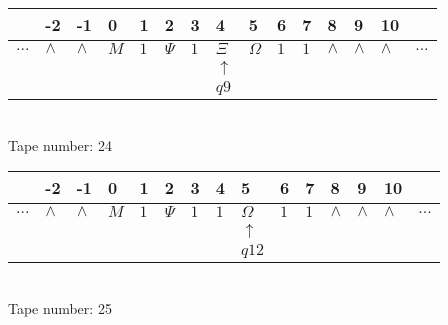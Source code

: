 \documentclass{article}
\begin{document}
\begin{table}[H]
\centering
\begin{tabular}{lllllllllllllll}
 & -2 & -1 & 0 & 1 & 2 & 3 & 4 & 5 & 6 & 7 & 8 & 9 & 10 & \\
\hline
$...$ & \multicolumn{1}{|l|}{$\wedge$} & \multicolumn{1}{|l|}{$\wedge$} & \multicolumn{1}{|l|}{$M$} & \multicolumn{1}{|l|}{$1$} & \multicolumn{1}{|l|}{$\Psi$} & \multicolumn{1}{|l|}{$1$} & \multicolumn{1}{|l|}{$\Xi$} & \multicolumn{1}{|l|}{$\Omega$} & \multicolumn{1}{|l|}{$1$} & \multicolumn{1}{|l|}{$1$} & \multicolumn{1}{|l|}{$\wedge$} & \multicolumn{1}{|l|}{$\wedge$} & \multicolumn{1}{|l|}{$\wedge$} & $...$\\
\hline
&  &  &  &  &  &  & $\uparrow$ &  &  &  &  &  &  &  \\
&  &  &  &  &  &  & $ q9 $ &  &  &  &  &  &  &  \\
\end{tabular}
\\
Tape number: 24
\noindent\makebox[\linewidth]{\hdashrule{\textwidth}{1pt}{1pt}}\end{table}

\begin{table}[H]
\centering
\begin{tabular}{lllllllllllllll}
 & -2 & -1 & 0 & 1 & 2 & 3 & 4 & 5 & 6 & 7 & 8 & 9 & 10 & \\
\hline
$...$ & \multicolumn{1}{|l|}{$\wedge$} & \multicolumn{1}{|l|}{$\wedge$} & \multicolumn{1}{|l|}{$M$} & \multicolumn{1}{|l|}{$1$} & \multicolumn{1}{|l|}{$\Psi$} & \multicolumn{1}{|l|}{$1$} & \multicolumn{1}{|l|}{$1$} & \multicolumn{1}{|l|}{$\Omega$} & \multicolumn{1}{|l|}{$1$} & \multicolumn{1}{|l|}{$1$} & \multicolumn{1}{|l|}{$\wedge$} & \multicolumn{1}{|l|}{$\wedge$} & \multicolumn{1}{|l|}{$\wedge$} & $...$\\
\hline
&  &  &  &  &  &  &  & $\uparrow$ &  &  &  &  &  &  \\
&  &  &  &  &  &  &  & $ q12 $ &  &  &  &  &  &  \\
\end{tabular}
\\
Tape number: 25
\noindent\makebox[\linewidth]{\hdashrule{\textwidth}{1pt}{1pt}}\end{table}
\end{document}
